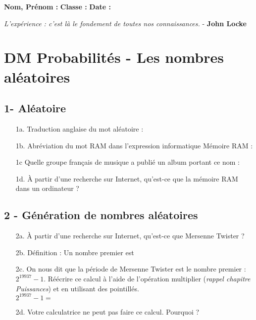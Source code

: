 



\textbf{Nom, Prénom :} \hspace{8cm} \textbf{Classe :} \hspace{3cm} \textbf{Date :}\\

\vspace{-0.8cm}

\begin{center}
  \textit{L’expérience : c’est là le fondement de toutes nos connaissances.}  - \textbf{John Locke}
\end{center}

\vspace{-0.8cm}
\section*{DM Probabilités - Les nombres aléatoires}

\subsection*{1- Aléatoire}

\begin{enumerate}
    \item[1a.] Traduction anglaise du mot aléatoire : \dotfill
    \item[1b.] Abréviation du mot RAM dans l'expression informatique Mémoire RAM : \dotfill
    \item[1c] Quelle groupe français de musique a publié un album portant ce nom : \dotfill
    \item[1d.] À partir d'une recherche sur Internet, qu’est-ce que la mémoire RAM dans un ordinateur ? \\ \Pointilles[8]
\end{enumerate} 


\subsection*{2 - Génération de nombres aléatoires}

\begin{enumerate}
    \item[2a.] À partir d'une recherche sur Internet, qu'est-ce que Mersenne Twister ? \\ \Pointilles[8]
    \item[2b.] Définition : Un nombre premier est \dotfill \\ \Pointilles[1]
    \item[2c.] On nous dit que la période de Mersenne Twister est le nombre premier : $2^{19937} - 1$.  Réécrire ce calcul à l'aide de l'opération multiplier (\textit{rappel chapitre Puissances}) et en utilisant des pointillés. \\

    $2^{19937} - 1 = $ \dotfill
    \item[2d.] Votre calculatrice ne peut pas faire ce calcul. Pourquoi ? \\ \Pointilles[2]
\end{enumerate} 

